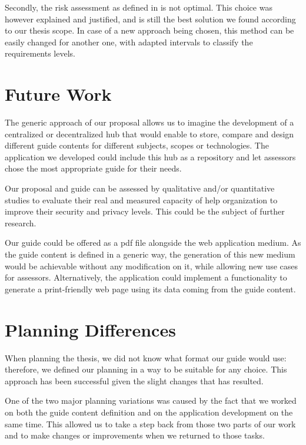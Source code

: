 Secondly, the risk assessment as defined in  is not optimal. This choice was however explained and justified, and is still the best solution we found according to our thesis scope. In case of a new approach being chosen, this method can be easily changed for another one, with adapted intervals to classify the requirements levels.

\section{Future Work}
\label{sec:conclusions_perspectives}

The generic approach of our proposal allows us to imagine the development of a centralized or decentralized hub that would enable to store, compare and design different guide contents for different subjects, scopes or technologies. The application we developed could include this hub as a repository and let assessors chose the most appropriate guide for their needs.

Our proposal and guide can be assessed by qualitative and/or quantitative studies to evaluate their real and measured capacity of help organization to improve their security and privacy levels. This could be the subject of further research.

Our guide could be offered as a \gls{pdf} file alongside the web application medium. As the guide content is defined in a generic way, the generation of this new medium would be achievable without any modification on it, while allowing new use cases for assessors. Alternatively, the application could implement a functionality to generate a print-friendly web page using its data coming from the guide content.

\section{Planning Differences}
\label{sec:conclusions_planning}

When planning the thesis, we did not know what format our guide would use: therefore, we defined our planning in a way to be suitable for any choice. This approach has been successful given the slight changes that has resulted.

One of the two major planning variations was caused by the fact that we worked on both the guide content definition and on the application development on the same time. This allowed us to take a step back from those two parts of our work and to make changes or improvements when we returned to those tasks.


